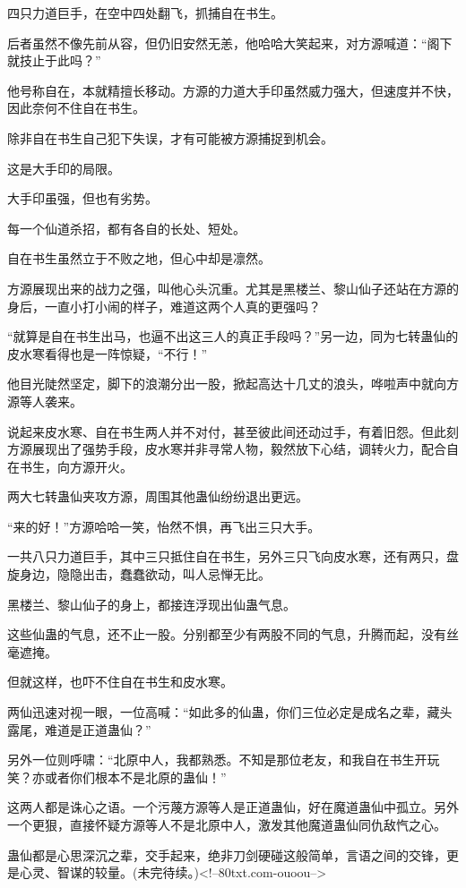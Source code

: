 \begin{this_body}
四只力道巨手，在空中四处翻飞，抓捕自在书生。

后者虽然不像先前从容，但仍旧安然无恙，他哈哈大笑起来，对方源喊道：“阁下就技止于此吗？”

他号称自在，本就精擅长移动。方源的力道大手印虽然威力强大，但速度并不快，因此奈何不住自在书生。

除非自在书生自己犯下失误，才有可能被方源捕捉到机会。

这是大手印的局限。

大手印虽强，但也有劣势。

每一个仙道杀招，都有各自的长处、短处。

自在书生虽然立于不败之地，但心中却是凛然。

方源展现出来的战力之强，叫他心头沉重。尤其是黑楼兰、黎山仙子还站在方源的身后，一直小打小闹的样子，难道这两个人真的更强吗？

“就算是自在书生出马，也逼不出这三人的真正手段吗？”另一边，同为七转蛊仙的皮水寒看得也是一阵惊疑，“不行！”

他目光陡然坚定，脚下的浪潮分出一股，掀起高达十几丈的浪头，哗啦声中就向方源等人袭来。

说起来皮水寒、自在书生两人并不对付，甚至彼此间还动过手，有着旧怨。但此刻方源展现出了强势手段，皮水寒并非寻常人物，毅然放下心结，调转火力，配合自在书生，向方源开火。

两大七转蛊仙夹攻方源，周围其他蛊仙纷纷退出更远。

“来的好！”方源哈哈一笑，怡然不惧，再飞出三只大手。

一共八只力道巨手，其中三只抵住自在书生，另外三只飞向皮水寒，还有两只，盘旋身边，隐隐出击，蠢蠢欲动，叫人忌惮无比。

黑楼兰、黎山仙子的身上，都接连浮现出仙蛊气息。

这些仙蛊的气息，还不止一股。分别都至少有两股不同的气息，升腾而起，没有丝毫遮掩。

但就这样，也吓不住自在书生和皮水寒。

两仙迅速对视一眼，一位高喊：“如此多的仙蛊，你们三位必定是成名之辈，藏头露尾，难道是正道蛊仙？”

另外一位则呼啸：“北原中人，我都熟悉。不知是那位老友，和我自在书生开玩笑？亦或者你们根本不是北原的蛊仙！”

这两人都是诛心之语。一个污蔑方源等人是正道蛊仙，好在魔道蛊仙中孤立。另外一个更狠，直接怀疑方源等人不是北原中人，激发其他魔道蛊仙同仇敌忾之心。

蛊仙都是心思深沉之辈，交手起来，绝非刀剑硬碰这般简单，言语之间的交锋，更是心灵、智谋的较量。(未完待续。)<!--80txt.com-ouoou-->

\end{this_body}

